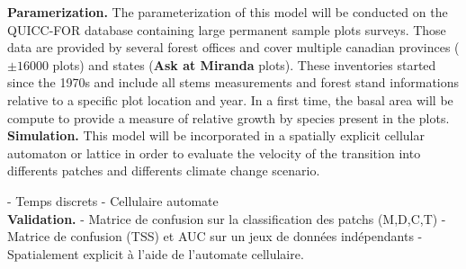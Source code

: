 \textbf{Paramerization.} The parameterization of this model will be
conducted on the QUICC-FOR database containing large permanent sample plots
surveys. Those data are provided by several forest offices and cover multiple
canadian provinces ($\pm16 000$ plots) and states (\textbf{Ask at Miranda} plots).
These inventories started since the 1970s and include all stems measurements
and forest stand informations relative to a specific plot location and year. In a first
time, the basal area will be compute to provide a measure of relative growth
by species present in the plots. \\

\textbf{Simulation.} This model will be incorporated in a spatially explicit cellular automaton or lattice in
order to evaluate the velocity of the transition into differents patches and differents
climate change scenario.

- Temps discrets
- Cellulaire automate\\

\textbf{Validation.} - Matrice de confusion sur la classification des patchs (M,D,C,T)
- Matrice de confusion (TSS) et AUC sur un jeux de données indépendants 
- Spatialement explicit à l'aide de l'automate cellulaire.


\newpage


